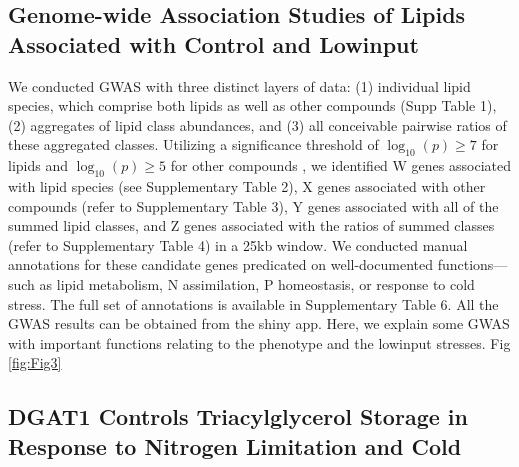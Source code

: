 \documentclass[10pt,letterpaper]{article}
\begin{document}
\subsection*{Genome-wide Association Studies of Lipids Associated with Control and Lowinput}
We conducted GWAS with three distinct layers of data: (1) individual lipid species, which comprise both lipids  as well as other compounds (Supp Table 1), (2) aggregates of lipid class abundances, and (3) all conceivable pairwise ratios of these aggregated classes. Utilizing a significance threshold of $\log_{10}(p)\ge7$ for lipids and $\log_{10}(p)\ge5$ for other compounds , we identified W genes associated with lipid species (see Supplementary Table 2), X genes associated with other compounds (refer to Supplementary Table 3), Y genes associated with all of the summed lipid classes, and Z genes associated with the ratios of summed classes (refer to Supplementary Table 4) in a 25kb window. We conducted manual annotations for these candidate genes predicated on well-documented functions—such as lipid metabolism, N assimilation, P homeostasis, or response to cold stress. The full set of annotations is available in Supplementary Table 6. All the GWAS results can be obtained from the shiny app. Here, we explain some GWAS with important functions relating to the phenotype and the lowinput stresses. Fig \ref{fig:Fig3}

\subsection*{DGAT1 Controls Triacylglycerol Storage in Response to Nitrogen Limitation and Cold}
\end{document}
